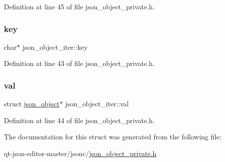 Definition at line 45 of file json\+\_\+object\+\_\+private.\+h.

\mbox{\label{structjson__object__iter_a0b76228b3a039075e9d84f88fa72ff53}} 
\subsubsection{\texorpdfstring{key}{key}}
{\footnotesize\ttfamily char$\ast$ json\+\_\+object\+\_\+iter\+::key}



Definition at line 43 of file json\+\_\+object\+\_\+private.\+h.

\mbox{\label{structjson__object__iter_aaae14a8d17aacddacb0a57234e0a4491}} 
\subsubsection{\texorpdfstring{val}{val}}
{\footnotesize\ttfamily struct \hyperlink{structjson__object}{json\+\_\+object}$\ast$ json\+\_\+object\+\_\+iter\+::val}



Definition at line 44 of file json\+\_\+object\+\_\+private.\+h.



The documentation for this struct was generated from the following file\+:\begin{DoxyCompactItemize}
\item 
qt-\/json-\/editor-\/master/jsonc/\hyperlink{json__object__private_8h}{json\+\_\+object\+\_\+private.\+h}\end{DoxyCompactItemize}
